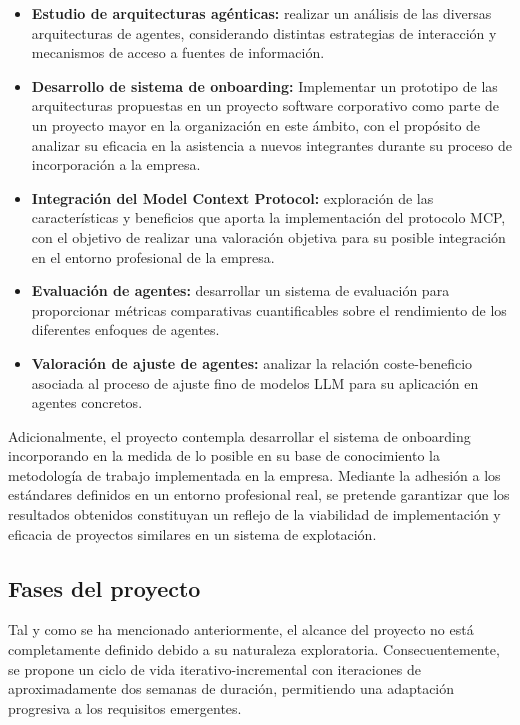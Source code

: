 \begin{itemize}
  \item\textbf{Estudio de arquitecturas agénticas: }realizar un análisis de las diversas arquitecturas de agentes, considerando distintas estrategias de interacción y mecanismos de acceso a fuentes de información.
  \item\textbf{Desarrollo de sistema de onboarding: }Implementar un prototipo de las arquitecturas propuestas en un proyecto software corporativo como parte de un proyecto mayor en la organización en este ámbito, con el propósito de analizar su eficacia en la asistencia a nuevos integrantes durante su proceso de incorporación a la empresa.
  \item\textbf{Integración del Model Context Protocol: }exploración de las características y beneficios que aporta la implementación del protocolo MCP, con el objetivo de realizar una valoración objetiva para su posible integración en el entorno profesional de la empresa.
  \item\textbf{Evaluación de agentes: }desarrollar un sistema de evaluación para proporcionar métricas comparativas cuantificables sobre el rendimiento de los diferentes enfoques de agentes. 
  \item\textbf{Valoración de ajuste de agentes: }analizar la relación coste-beneficio asociada al proceso de ajuste fino de modelos LLM para su aplicación en agentes concretos.
\end{itemize}

Adicionalmente, el proyecto contempla desarrollar el sistema de onboarding incorporando en la medida de lo posible en su base de conocimiento la metodología de trabajo implementada en la empresa. Mediante la adhesión a los estándares definidos en un entorno profesional real, se pretende garantizar que los resultados obtenidos constituyan un reflejo de la viabilidad de implementación y eficacia de proyectos similares en un sistema de explotación. 

\subsection{Fases del proyecto}
Tal y como se ha mencionado anteriormente, el alcance del proyecto no está completamente definido debido a su naturaleza exploratoria. Consecuentemente, se propone un ciclo de vida iterativo-incremental con iteraciones de aproximadamente dos semanas de duración, permitiendo una adaptación progresiva a los requisitos emergentes.

